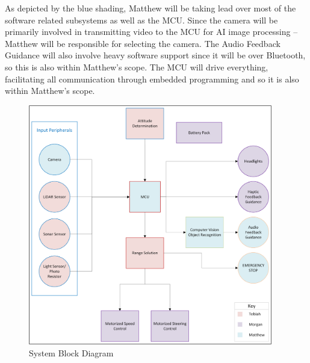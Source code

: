 \noindent As depicted by the blue shading, Matthew will be taking lead over most of the software related subsystems as well as the MCU. Since the camera will be primarily involved in transmitting video to the MCU for AI image processing – Matthew will be responsible for selecting the camera. The Audio Feedback Guidance will also involve heavy software support since it will be over Bluetooth, so this is also within Matthew’s scope. The MCU will drive everything, facilitating all communication through embedded programming and so it is also within Matthew’s scope.

\begin{figure}[H]
	\centering
	\includegraphics[width=0.95\textwidth]{./Images/AbstractSysBlk.png}
	\caption{\label{fig:AbstractSysBlk}System Block Diagram}
\end{figure}
